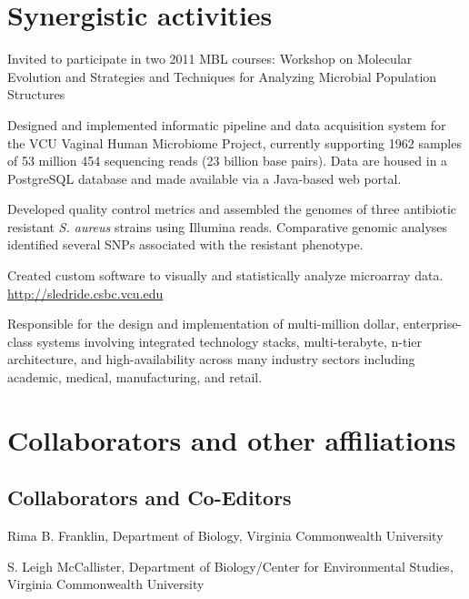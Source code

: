 \section{Synergistic activities}
\begin{packed_item}
	\item{Invited to participate in two 2011 MBL courses: Workshop on Molecular Evolution and Strategies 
	and Techniques for Analyzing Microbial Population Structures}
	\item{Designed and implemented informatic pipeline and data acquisition system for the VCU Vaginal Human Microbiome 
	Project, currently supporting \num{1962} samples of 53 million 454 sequencing reads (23 billion base pairs).  Data 
	are housed in a PostgreSQL database and made available via a Java-based web portal.}
	\item{Developed quality control metrics and assembled the genomes of three antibiotic resistant \textit{S. aureus} 
	strains using Illumina reads.  Comparative genomic analyses identified several SNPs associated with the resistant phenotype.}
	\item{Created custom software to visually and statistically analyze microarray data.\\
	 \url{http://sledride.csbc.vcu.edu}}
	\item{Responsible for the design and implementation of multi-million dollar, enterprise-class systems involving 
	integrated technology stacks, multi-terabyte, n-tier architecture, and high-availability across many industry 
	sectors including academic, medical, manufacturing, and retail.}
\end{packed_item}

\section{Collaborators and other affiliations}

\subsection*{Collaborators and Co-Editors}
\begin{packed_item}
	\item{Rima B. Franklin, Department of Biology, Virginia Commonwealth University}
	\item{S. Leigh McCallister, Department of Biology/Center for Environmental Studies, 
	Virginia Commonwealth University}		
\end{packed_item}

